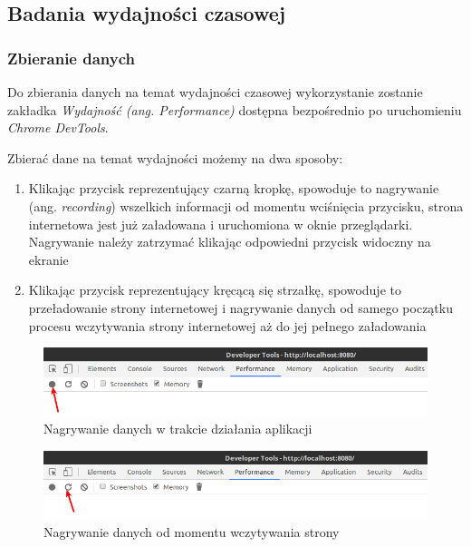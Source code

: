 \documentclass[polish, twoside, 12pt]{mwart}
\begin{document}
\subsection{Badania wydajności czasowej} 

\subsubsection{Zbieranie danych} \label{gathering-time-performance-data}
Do zbierania danych na temat wydajności czasowej wykorzystanie zostanie zakładka \emph{Wydajność (ang. Performance)} dostępna bezpośrednio po uruchomieniu \emph{Chrome DevTools}.

Zbierać dane na temat wydajności możemy na dwa sposoby:

\begin{enumerate}
  \item Klikając przycisk reprezentujący czarną kropkę, spowoduje to nagrywanie (ang. \emph{recording}) wszelkich informacji od momentu wciśnięcia przycisku, strona internetowa jest już załadowana i uruchomiona w oknie przeglądarki. Nagrywanie należy zatrzymać klikając odpowiedni przycisk widoczny na ekranie
  \item Klikając przycisk reprezentujący kręcącą się strzałkę, spowoduje to przeładowanie strony internetowej i nagrywanie danych od samego początku procesu wczytywania strony internetowej aż do jej pełnego załadowania
\end{enumerate}

\begin{figure}[ht]
  \includegraphics[width=\textwidth]{chrome-devtools-performance-recording-runtime.png}
	\caption{Nagrywanie danych w trakcie działania aplikacji}
\end{figure} 

\begin{figure}[ht]
  \includegraphics[width=\textwidth]{chrome-devtools-performance-recording-reload.png}
	\caption{Nagrywanie danych od momentu wczytywania strony}
\end{figure}
\end{document}

